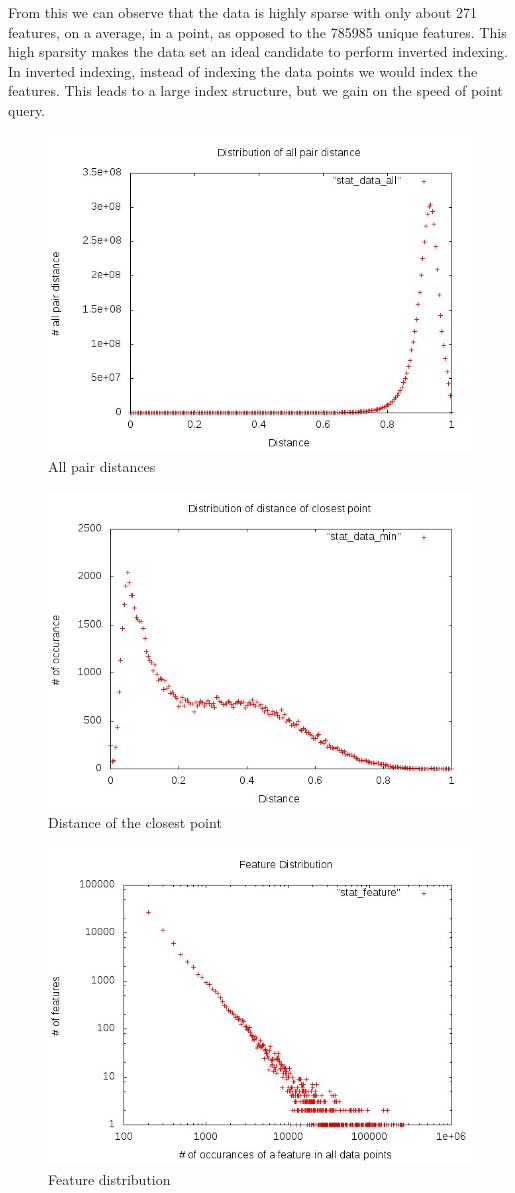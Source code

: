 From this we can observe that the data is highly sparse with only about 271 features, on a average, in a point, as opposed to the 785985 unique features. This high sparsity makes the data set an ideal candidate to perform inverted indexing. In inverted indexing, instead of indexing the data points we would index the features. This leads to a large index structure, but we gain on the speed of point query. \\

\begin{figure}[ht!]	
\centering
\includegraphics[width=0.7 \columnwidth]{img/all.jpg}
\caption{All pair distances}
\end{figure}
\begin{figure}[ht!]	
\centering
\includegraphics[width=0.7 \columnwidth]{img/min.jpg}
\caption{Distance of the closest point}
\end{figure}

\begin{figure}[ht!]	
\centering
\includegraphics[width=0.7 \columnwidth]{img/feature.jpg}
\caption{Feature distribution}
\end{figure}


